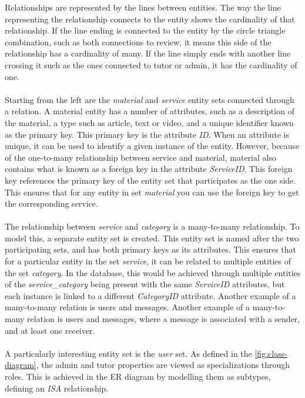 Relationships are represented by the lines between entities.
The way the line representing the relationship connects to the entity shows the cardinality of that relationship.
If the line ending is connected to the entity by the circle triangle combination, such as both connections to review, it means this side of the relationship has a cardinality of many.
If the line simply ends with another line crossing it such as the ones connected to tutor or admin, it has the cardinality of one.
\\\\
Starting from the left are the \textit{material} and \textit{service} entity sets connected through a relation. 
A material entity has a number of attributes, such as a description of the material, a type such as article, text or video, and a unique identifier known as the primary key.
This primary key is the attribute \textit{ID}.
When an attribute is unique, it can be used to identify a given instance of the entity. 
However, because of the one-to-many relationship between service and material, material also contains what is known as a foreign key in the attribute \textit{ServiceID}.
This foreign key references the primary key of the entity set that participates as the one side. 
This ensures that for any entity in set \textit{material} you can use the foreign key to get the corresponding service.
\\\\
The relationship between \textit{service} and \textit{category} is a many-to-many relationship.
To model this, a separate entity set is created.
This entity set is named after the two participating sets, and has both primary keys as its attributes.
This ensures that for a particular entity in the set \textit{service}, it can be related to multiple entities of the set \textit{category}.
In the database, this would be achieved through multiple entities of the \textit{service\_category} being present with the same \textit{ServiceID} attributes, but each instance is linked to a different \textit{CategoryID} attribute.
Another example of a many-to-many relation is users and messages.
Another example of a many-to-many relation is users and messages, where a message is associated with a sender, and at least one receiver.
\\\\
A particularly interesting entity set is the \textit{user} set. 
As defined in the \autoref{fig:class-diagram}, the admin and tutor properties are viewed as specializations through roles.
This is achieved in the ER diagram by modelling them as subtypes, defining an \textit{ISA} relationship.
